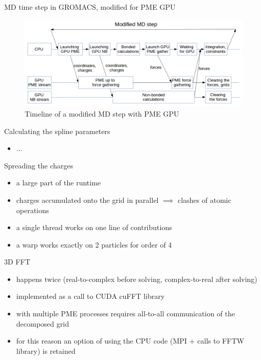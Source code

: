 \documentclass[11pt]{beamer}
\begin{document}
\begin{frame}{MD time step in GROMACS, modified for PME GPU}
\begin{figure}
    \centering
    \includegraphics[width=1\textwidth]{pics/mdstep-gpu.png}
    \caption{Timeline of a modified MD step with PME GPU}
\end{figure}
\FloatBarrier
\end{frame}

\begin{frame}{Calculating the spline parameters}
\begin{itemize}
\item...
\end{itemize}
\end{frame}

\begin{frame}{Spreading the charges}
\begin{itemize}
\item a large part of the runtime
\item charges accumulated onto the grid in parallel $\implies$ clashes of atomic operations
\item a single thread works on one line of contributions
\item a warp works exactly on 2 particles for order of 4
\end{itemize}
\end{frame}

\begin{frame}{3D FFT}
\begin{itemize}
\item happens twice (real-to-complex before solving, complex-to-real after solving)
\item implemented as a call to CUDA cuFFT library
\item with multiple PME processes requires all-to-all communication of the decomposed grid
\item for this reason an option of using the CPU code (MPI + calls to FFTW library) is retained
\end{itemize}
\end{frame}
\end{document}
